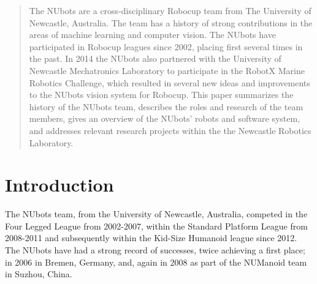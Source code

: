 \documentclass{llncs}
\begin{document}
\begin{abstract}
The NUbots are a cross-disciplinary Robocup team from The University of Newcastle, Australia. The team has a history of strong contributions in the areas of machine learning and computer vision. The NUbots have participated in Robocup leagues since 2002, placing first several times in the past. In 2014 the NUbots also partnered with the University of Newcastle Mechatronics Laboratory to participate in the RobotX Marine Robotics Challenge, which resulted in several new ideas and improvements to the NUbots vision system for Robocup. This paper summarizes the history of the NUbots team, describes the roles and research of the team members, gives an overview of the NUbots' robots and software system, and addresses relevant research projects within the the Newcastle Robotics Laboratory.

\end{abstract}

%
\section{Introduction}
%
The NUbots team, from the University of Newcastle, Australia, competed in the Four Legged League from 2002-2007, within the Standard Platform League from 2008-2011 and subsequently within the Kid-Size Humanoid league since 2012. The NUbots have had a strong record of successes, twice achieving a first place; in 2006 in Bremen, Germany, and, again in 2008 as part of the NUManoid team in Suzhou, China.
\end{document}
